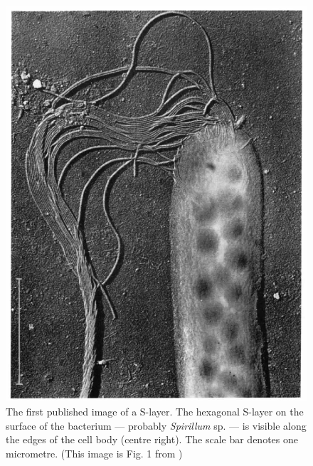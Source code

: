     \begin{figure}[p] %
            \begin{center}
                \includegraphics[]{intro/img/firstslayer.pdf}
            \end{center}
            \caption[The first published image of a \ac{S-layer}.]{The first published image of a \ac{S-layer}. The hexagonal \ac{S-layer} on the surface of the bacterium --- probably \textit{Spirillum} sp. --- is visible along the edges of the cell body (centre right). The scale bar denotes one micrometre. (This image is Fig. 1 from  )}
            \label{fig:firstslayer}
    \end{figure}
    
